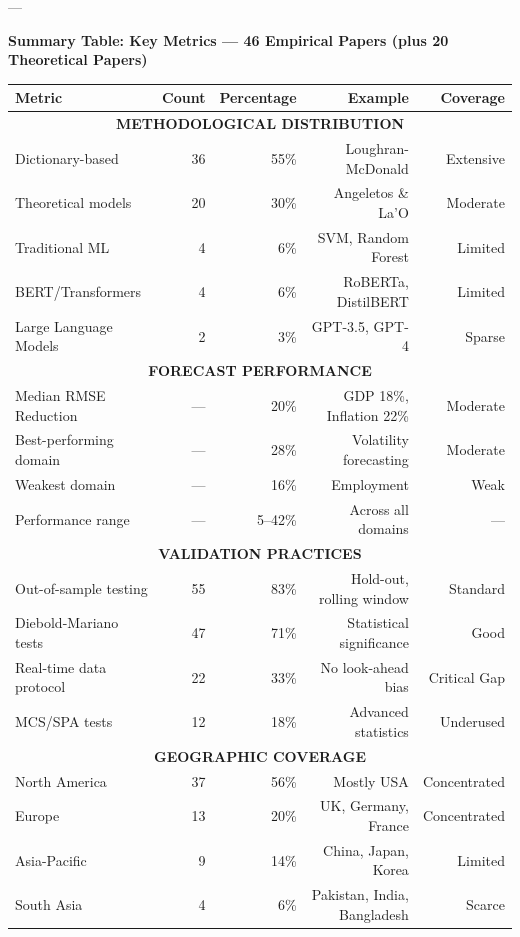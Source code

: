 \documentclass[11pt]{article}
\begin{document}
---

\noindent\textbf{Summary Table: Key Metrics — 46 Empirical Papers (plus 20 Theoretical Papers)}

\begin{table}[H]
\centering \small
\begin{tabular}{|l|r|r|r|r|}
\hline
\textbf{Metric} & \textbf{Count} & \textbf{Percentage} & \textbf{Example} & \textbf{Coverage} \\
\hline
\multicolumn{5}{|c|}{\textbf{METHODOLOGICAL DISTRIBUTION}} \\
\hline
Dictionary-based & 36 & 55\% & Loughran-McDonald & Extensive \\
Theoretical models & 20 & 30\% & Angeletos \& La'O & Moderate \\
Traditional ML & 4 & 6\% & SVM, Random Forest & Limited \\
BERT/Transformers & 4 & 6\% & RoBERTa, DistilBERT & Limited \\
Large Language Models & 2 & 3\% & GPT-3.5, GPT-4 & Sparse \\
\hline
\multicolumn{5}{|c|}{\textbf{FORECAST PERFORMANCE}} \\
\hline
Median RMSE Reduction & — & 20\% & GDP 18\%, Inflation 22\% & Moderate \\
Best-performing domain & — & 28\% & Volatility forecasting & Moderate \\
Weakest domain & — & 16\% & Employment & Weak \\
Performance range & — & 5--42\% & Across all domains & — \\
\hline
\multicolumn{5}{|c|}{\textbf{VALIDATION PRACTICES}} \\
\hline
Out-of-sample testing & 55 & 83\% & Hold-out, rolling window & Standard \\
Diebold-Mariano tests & 47 & 71\% & Statistical significance & Good \\
Real-time data protocol & 22 & 33\% & No look-ahead bias & Critical Gap \\
MCS/SPA tests & 12 & 18\% & Advanced statistics & Underused \\
\hline
\multicolumn{5}{|c|}{\textbf{GEOGRAPHIC COVERAGE}} \\
\hline
North America & 37 & 56\% & Mostly USA & Concentrated \\
Europe & 13 & 20\% & UK, Germany, France & Concentrated \\
Asia-Pacific & 9 & 14\% & China, Japan, Korea & Limited \\
South Asia & 4 & 6\% & Pakistan, India, Bangladesh & Scarce \\

\end{tabular}
\end{table}
\end{document}
